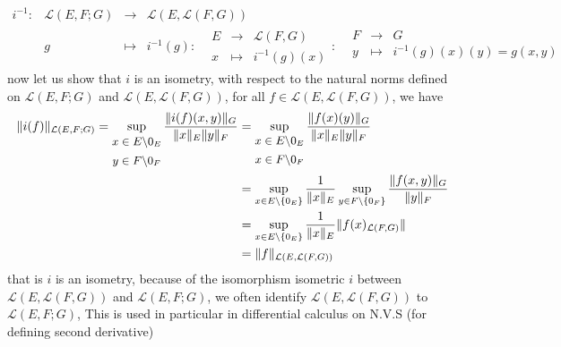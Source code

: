 \[
\begin{array}{cccc}
      i^{-1} : &  
	       \mathcal{L} (E,F;G) & \longrightarrow & 
	       \mathcal{L} \left( E, \mathcal{L} (F,G)  \right)\\
           &  g  & \longmapsto     & i^{-1}(g)  : 
	   \begin{array}{cccc}
	           &  E   & \longrightarrow &  \mathcal{L}
		   (F,G) \\
	              &    x& \longmapsto     & i^{-1}(g) (x)   
	   \end{array} 
	   : 
	   \begin{array}{cccc}
	           &  F  & \longrightarrow &  G \\
	   
	              &   y& \longmapsto     & 
		      i^{-1}(g) (x) (y) = g(x,y)  \\
	   \end{array}
\end{array}
\]
now let us show that $i $ is an isometry, with respect to the natural
norms defined on $\mathcal{L} (E,F;G)  $  and 
$\mathcal{L} (E,\mathcal{L} (F,G) )  $, for all 
$f \in  \mathcal{L} (E, \mathcal{L} (F,G) )  $, we have 
\begin{align*}
\| i(f)  \| _{ \mathcal{L} (E,F;G) } = 
\sup_{
	\small
	\begin{gathered}  
		x \in  E \backslash {0_{E}}\\  
		y \in  F \backslash {0_{F}}
	\end{gathered}
	\normalfont
} 
\frac{\| i(f) (x,y)  \| _{G}}{
\| x \| _{E} \| y \| _{F}} &= 
\sup_{
	\small
	\begin{gathered}  
		x \in E \backslash {0_{E}}\\ 
		x \in F \backslash {0_{F}}\\ 
	\end{gathered}
	\normalfont
} 
\frac{\| f(x) (y)  \| _{G}}{
\| x \| _{E} \| y \| _{F}}
\\
			   &= 
\sup_{x \in E \backslash \left\{ 0_{E} \right\}}  
\frac{1}{\| x \| _{E}}  
\sup_{y \in  F \backslash \left\{ 0_{F} \right\}}  
\frac{\| f(x,y)  \| _{G}}{
\| y \| _{F}} \\
&= \sup_{x \in E \backslash \left\{ 0_{E} \right\}}  
\frac{1}{\| x \| _{E}} 
\| f(x) _{\mathcal{L} (F,G) } \|  \\
&= 
\| f \| _{\mathcal{L} \left( E,\mathcal{L} (F,G)  \right)}
\end{align*}
that is $i $ is an isometry, because
of the isomorphism isometric 
$i $ between $\mathcal{L} (E, \mathcal{L} (F,G) )  $ 
and $\mathcal{L} (E,F;G)  $, we often identify 
$\mathcal{L} (E,\mathcal{L} (F,G) )  $ to 
$\mathcal{L} (E,F;G)  $, This is used 
in particular in differential calculus on N.V.S 
(for defining second derivative)

